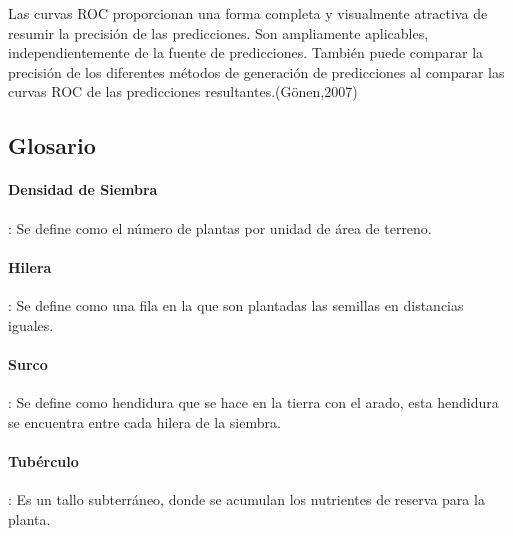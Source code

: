 Las curvas ROC proporcionan una forma completa y visualmente atractiva de resumir la precisión de las predicciones. Son ampliamente aplicables, independientemente de la fuente de predicciones. También puede comparar la precisión de los diferentes métodos de generación de predicciones al comparar las curvas ROC de las predicciones resultantes.(Gönen,2007)

 
\subsection{Glosario}

\paragraph{Densidad de Siembra}: Se define como el número de plantas por unidad de área de terreno.

\paragraph{Hilera}: Se define como una fila en la que son plantadas las semillas en distancias iguales.

\paragraph{Surco}: Se define como hendidura que se hace en la tierra con el arado, esta hendidura se encuentra entre cada hilera de la siembra.  

\paragraph{Tubérculo}: Es un tallo subterráneo, donde se acumulan los nutrientes de reserva para la planta.



